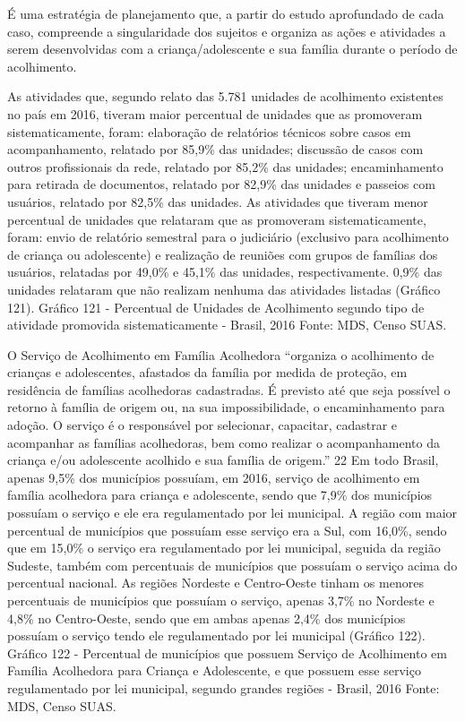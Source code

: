 \documentclass[
  brazilian]{report}
\begin{document}
É uma estratégia de planejamento que, a partir do estudo aprofundado de
cada caso, compreende a singularidade dos sujeitos e organiza as ações e
atividades a serem desenvolvidas com a criança/adolescente e sua família
durante o período de acolhimento.

As atividades que, segundo relato das 5.781 unidades de acolhimento
existentes no país em 2016, tiveram maior percentual de unidades que as
promoveram sistematicamente, foram: elaboração de relatórios técnicos
sobre casos em acompanhamento, relatado por 85,9\% das unidades;
discussão de casos com outros profissionais da rede, relatado por 85,2\%
das unidades; encaminhamento para retirada de documentos, relatado por
82,9\% das unidades e passeios com usuários, relatado por 82,5\% das
unidades. As atividades que tiveram menor percentual de unidades que
relataram que as promoveram sistematicamente, foram: envio de relatório
semestral para o judiciário (exclusivo para acolhimento de criança ou
adolescente) e realização de reuniões com grupos de famílias dos
usuários, relatadas por 49,0\% e 45,1\% das unidades, respectivamente.
0,9\% das unidades relataram que não realizam nenhuma das atividades
listadas (Gráfico 121). Gráfico 121 - Percentual de Unidades de
Acolhimento segundo tipo de atividade promovida sistematicamente -
Brasil, 2016 Fonte: MDS, Censo SUAS.

O Serviço de Acolhimento em Família Acolhedora ``organiza o acolhimento
de crianças e adolescentes, afastados da família por medida de proteção,
em residência de famílias acolhedoras cadastradas. É previsto até que
seja possível o retorno à família de origem ou, na sua impossibilidade,
o encaminhamento para adoção. O serviço é o responsável por selecionar,
capacitar, cadastrar e acompanhar as famílias acolhedoras, bem como
realizar o acompanhamento da criança e/ou adolescente acolhido e sua
família de origem.'' 22 Em todo Brasil, apenas 9,5\% dos municípios
possuíam, em 2016, serviço de acolhimento em família acolhedora para
criança e adolescente, sendo que 7,9\% dos municípios possuíam o serviço
e ele era regulamentado por lei municipal. A região com maior percentual
de municípios que possuíam esse serviço era a Sul, com 16,0\%, sendo que
em 15,0\% o serviço era regulamentado por lei municipal, seguida da
região Sudeste, também com percentuais de municípios que possuíam o
serviço acima do percentual nacional. As regiões Nordeste e Centro-Oeste
tinham os menores percentuais de municípios que possuíam o serviço,
apenas 3,7\% no Nordeste e 4,8\% no Centro-Oeste, sendo que em ambas
apenas 2,4\% dos municípios possuíam o serviço tendo ele regulamentado
por lei municipal (Gráfico 122). Gráfico 122 - Percentual de municípios
que possuem Serviço de Acolhimento em Família Acolhedora para Criança e
Adolescente, e que possuem esse serviço regulamentado por lei municipal,
segundo grandes regiões - Brasil, 2016 Fonte: MDS, Censo SUAS.
\end{document}
